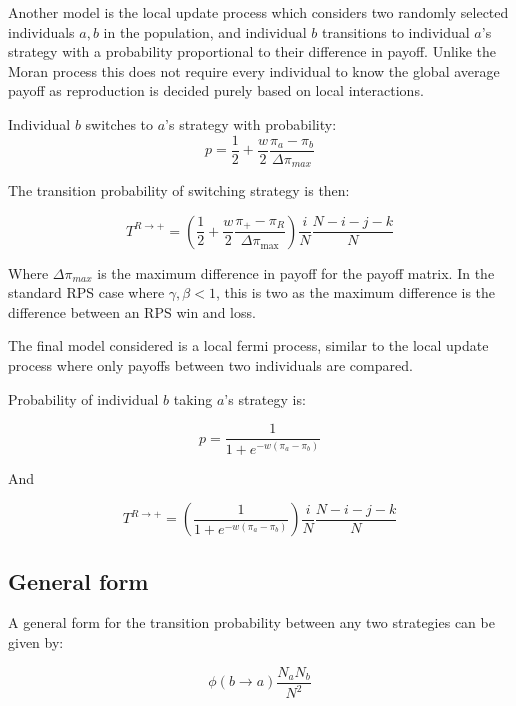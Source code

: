 \documentclass[%
 reprint,
 amsmath,amssymb,
 aps,
]{revtex4-2}
\begin{document}
Another model is the local update process which considers two 
randomly selected individuals $a,b$ in the population, and individual
$b$ transitions to individual $a$'s strategy with a probability proportional to 
their difference in payoff. Unlike the Moran process this does not require
every individual to know the global average payoff as reproduction 
is decided purely based on local interactions.


Individual $b$ switches to $a$'s strategy with probability:
\begin{equation}
p = \frac{1}{2} + \frac{w}{2} \frac{\pi_a - \pi_b}{\Delta \pi_{max}}
\end{equation}

The transition probability of switching strategy is then:

\begin{equation}
  T^{R \rightarrow +} = \left (\frac{1}{2} + \frac{w}{2} \frac{\pi_+ - \pi_R}{\Delta \pi_{\text{max}}} \right ) \frac{i}{N} \frac{N - i - j - k}{N}
\end{equation}

Where $\Delta \pi_{max}$ is the maximum difference in payoff for the payoff matrix.
In the standard RPS case where $\gamma, \beta < 1$, this is two as the maximum difference
is the difference between an RPS win and loss.


The final model considered is a local
fermi process, similar to the local update process where only 
payoffs between two individuals are compared.

Probability of individual $b$ taking $a$'s strategy is:

\begin{equation}
p = \frac{1}{1 + e^{-w(\pi_a- \pi_b)}} \nonumber
\end{equation}

And 


\begin{equation}
T^{R \rightarrow +} = \left( \frac{1}{1 + e^{-w(\pi_a - \pi_b)}}\right) \frac{i}{N} \frac{N-i-j-k}{N}
\end{equation}


\subsection{General form}

A general form for the transition probability between any two 
strategies can be given by:

\begin{equation}
  \phi(b \rightarrow a) \frac{N_a N_b}{N^2} \nonumber
\end{equation}
\end{document}
